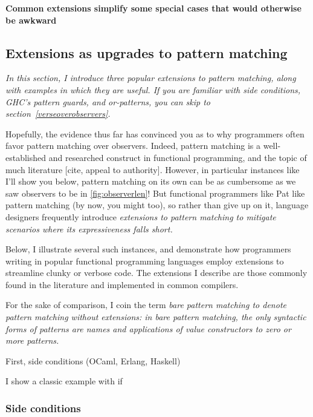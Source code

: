 \documentclass[manuscript,screen,review, 12pt]{acmart}
\begin{document}
\begin{outline}[enumerate]
    \1 \bf{Common extensions simplify some special cases that would otherwise be awkward}

\subsection{Extensions as upgrades to pattern matching}
\label{extensions}
    \it{In this section, I introduce three popular extensions to pattern
    matching, along with examples in which they are useful. If you are familiar
    with side conditions, GHC's pattern guards, and or-patterns, you can skip to
    section~\ref{verseoverobservers}.}

    Hopefully, the evidence thus far has convinced you as to why programmers
    often favor pattern matching over observers. Indeed, pattern matching is a
    well-established and researched construct in functional programming, and the
    topic of much literature [cite, appeal to authority]. However, in particular
    instances like I'll show you below, pattern matching on its own can be as
    cumbersome as we saw observers to be in \ref{fig:observerlen}! But
    functional programmers like Pat like pattern matching (by now, you might
    too), so rather than give up on it, language designers frequently introduce
    \it{extensions} to pattern matching to mitigate scenarios where its
    expressiveness falls short. 
    
    Below, I illustrate several such instances, and demonstrate how programmers
    writing in popular functional programming languages employ extensions to
    streamline clunky or verbose code. The extensions I describe are those
    commonly found in the literature and implemented in common compilers.
    
    For the sake of comparison, I coin the term \it{bare pattern matching} to
    denote pattern matching \it{without} extensions: in bare pattern matching,
    the only syntactic forms of patterns are names and applications of value
    constructors to zero or more patterns. 
    
    \2 First, side conditions (OCaml, Erlang, Haskell)

    \3 I show a classic example with if 

\subsubsection{Side conditions}


\end{outline}
\end{document}

